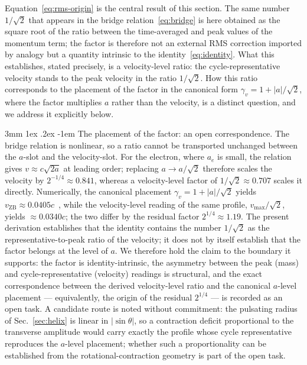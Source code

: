 \documentclass[%
 reprint, amsmath,amssymb, aps, prb, ]{revtex4-2}
\makeatletter
\numberwithin{equation}{section}
\renewcommand\paragraph{%
  \@startsection{paragraph}{4}{\z@}%
    {3mm \@plus 1ex \@minus .2ex}%
    {-1em}%
    {\normalfont\normalsize\itshape}}
\newcommand{\vZB}{v_{\text{ZB}}}
\makeatother
\begin{document}
Equation~\eqref{eq:rms-origin} is the central result of this section. The same number $1/\sqrt{2}$ that appears in the bridge relation~\eqref{eq:bridge} is here obtained as the square root of the ratio between the time-averaged and peak values of the momentum term; the factor is therefore not an external RMS correction imported by analogy but a quantity intrinsic to the identity~\eqref{eq:identity}. What this establishes, stated precisely, is a velocity-level ratio: the cycle-representative velocity stands to the peak velocity in the ratio $1/\sqrt{2}$. How this ratio corresponds to the placement of the factor in the canonical form $\gamma_v = 1 + \lvert a\rvert/\sqrt{2}$, where the factor multiplies $a$ rather than the velocity, is a distinct question, and we address it explicitly below.

\paragraph{The placement of the factor: an open correspondence.}
The bridge relation is nonlinear, so a ratio cannot be transported unchanged between the $a$-slot and the velocity-slot. For the electron, where $a_e$ is small, the relation gives $v \approx c\sqrt{2a}$ at leading order; replacing $a \to a/\sqrt{2}$ therefore scales the velocity by $2^{-1/4} \approx 0.841$, whereas a velocity-level factor of $1/\sqrt{2} \approx 0.707$ scales it directly. Numerically, the canonical placement $\gamma_v = 1+\lvert a\rvert/\sqrt{2}$ yields $\vZB \approx 0.0405c$~\cite{hanamura10}, while the velocity-level reading of the same profile, $v_{\max}/\sqrt{2}$, yields $\approx 0.0340c$; the two differ by the residual factor $2^{1/4} \approx 1.19$. The present derivation establishes that the identity contains the number $1/\sqrt{2}$ as the representative-to-peak ratio of the velocity; it does not by itself establish that the factor belongs at the level of $a$. We therefore hold the claim to the boundary it supports: the factor is identity-intrinsic, the asymmetry between the peak (mass) and cycle-representative (velocity) readings is structural, and the exact correspondence between the derived velocity-level ratio and the canonical $a$-level placement --- equivalently, the origin of the residual $2^{1/4}$ --- is recorded as an open task. A candidate route is noted without commitment: the pulsating radius of Sec.~\ref{sec:helix} is linear in $\lvert\sin\theta\rvert$, so a contraction deficit proportional to the transverse amplitude would carry exactly the profile whose cycle representative reproduces the $a$-level placement; whether such a proportionality can be established from the rotational-contraction geometry is part of the open task.
\end{document}
